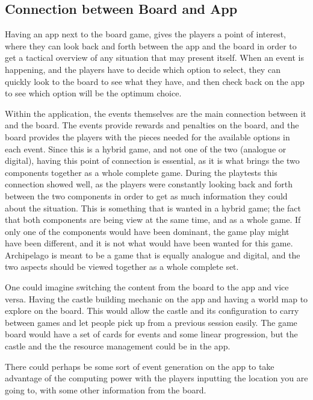 \subsection{Connection between Board and App}
Having an app next to the board game, gives the players a point of interest, where they can look back and forth between the app and the board in order to get a tactical overview of any situation that may present itself. When an event is happening, and the players have to decide which option to select, they can quickly look to the board to see what they have, and then check back on the app to see which option will be the optimum choice.

Within the application, the events themselves are the main connection between it and the board. The events provide rewards and penalties on the board, and the board provides the players with the pieces needed for the available options in each event. 
Since this is a hybrid game, and not one of the two (analogue or digital), having this point of connection is essential, as it is what brings the two components together as a whole complete game. During the playtests this connection showed well, as the players were constantly looking back and forth between the two components in order to get as much information they could about the situation. This is something that is wanted in a hybrid game; the fact that both components are being view at the same time, and as a whole game. If only one of the components would have been dominant, the game play might have been different, and it is not what would have been wanted for this game. Archipelago is meant to be a game that is equally analogue and digital, and the two aspects should be viewed together as a whole complete set.


One could imagine switching the content from the board to the app and vice versa. Having the castle building mechanic on the app and having a world map to explore on the board.
This would allow the castle and its configuration to carry between games and let people pick up from a previous session easily. 
The game board would have a set of cards for events and some linear progression, but the castle and the the resource management could be in the app. 

There could perhaps be some sort of event generation on the app to take advantage of the computing power with the players inputting the location you are going to, with some other information from the board. 

